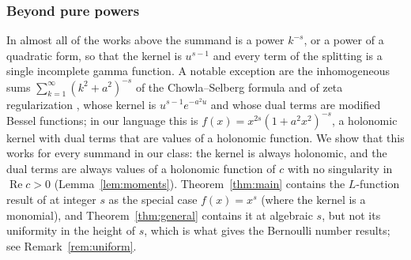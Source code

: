 \documentclass[11pt]{amsart}
\theoremstyle{definition}
\theoremstyle{remark}
\begin{document}
\subsubsection{Beyond pure powers}
In almost all of the works above the summand is a power $k^{-s}$, or a power of a quadratic form, so that the kernel
is $u^{s-1}$ and every term of the splitting is a single incomplete gamma function. A notable exception are the
inhomogeneous sums $\sum_{k=1}^{\infty} (k^2+a^2)^{-s}$ of the Chowla--Selberg formula and of zeta regularization
\cite{CS67,Eli95,Kir02}, whose kernel is $u^{s-1}e^{-a^2u}$ and whose dual terms are modified Bessel functions; in our
language this is $f(x) = x^{2s}(1+a^2x^2)^{-s}$, a holonomic kernel with dual terms that are values of a holonomic
function. We show that this works for every summand in our class: the kernel is always holonomic, and the dual terms
are always values of a holonomic function of $c$ with no singularity in $\operatorname{Re} c > 0$
(Lemma~\ref{lem:moments}). Theorem~\ref{thm:main} contains the $L$-function result of \cite{Joh21} at integer $s$ as
the special case $f(x) = x^s$ (where the kernel is a monomial), and Theorem~\ref{thm:general} contains it at algebraic
$s$, but not its uniformity in the height of $s$, which is what gives the Bernoulli number results; see
Remark~\ref{rem:uniform}.
\end{document}
